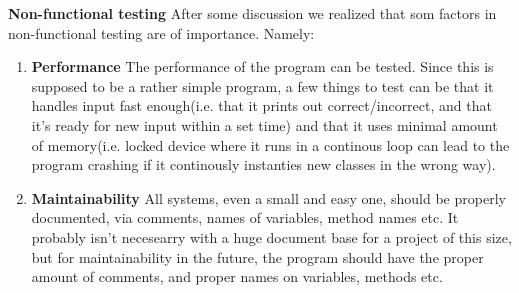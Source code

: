 \documentclass{article}
\begin{document}
	\textbf{Non-functional testing}
	After some discussion we realized that som factors in non-functional testing
	are of importance. Namely:
	\begin{enumerate}
		\item
		\textbf{Performance}
		The performance of the program can be tested. Since this is supposed to be a rather simple program,
		a few things to test can be that it handles input fast enough(i.e. that it prints out correct/incorrect, and that it's ready
		for new input within a set time) and that it uses minimal amount of memory(i.e. locked device where it runs in a continous
		loop can lead to the program crashing if it continously instanties new classes in the wrong way).
		\begin{comment}
		After each game "round" the program calls: new Game()
		which can be a performance bottleneck whereas one plays
		this game several million times. This can happen in situations
		where this program are loaded onto a locked device for playing.
		So instead of calling new Game() one should simply call a startMethod instead.
		And move the internal statements in the constructor over in that method so we 
		avoid having multiple Games on the stack which increases space requirements.
		\end{comment}

		\item
		\textbf{Maintainability}
		All systems, even a small and easy one, should be properly documented, via comments, names of variables, method names
		etc. It probably isn't necesearry with a huge document base for a project of this size, but for maintainability in the future,
		the program should have the proper amount of comments, and proper names on variables, methods etc.
		\begin{comment}
		The system is poorly documented and the statements is not intuitively named everywhere.
		There are also some methods which doesn\'t do anything except increasing the complexity of
		the program. Also there are places where exceptions are caught individually without any
		purpose. And all of this makes the code harder to analyze and or change.
		\end{comment}

	\end{enumerate}


\end{document}
